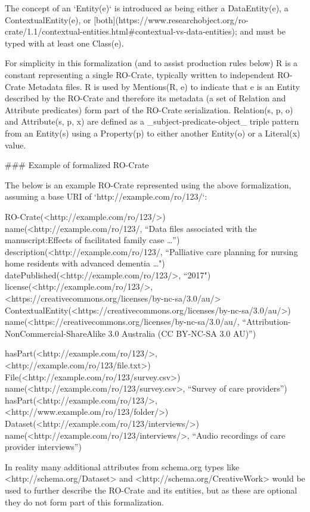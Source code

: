 The concept of an `Entity(e)` is introduced as being either a DataEntity(e), a ContextualEntity(e), or [both](https://www.researchobject.org/ro-crate/1.1/contextual-entities.html#contextual-vs-data-entities); and must be typed with at least one Class(e). 

For simplicity in this formalization (and to assist production rules below) R is a constant representing a single RO-Crate, typically written to independent RO-Crate Metadata files. R is used by Mentions(R, e) to indicate that e is an Entity described by the RO-Crate and therefore its metadata (a set of Relation and Attribute predicates) form part of the RO-Crate serialization. Relation(s, p, o) and Attribute(s, p, x) are defined as a _subject-predicate-object_ triple pattern from an Entity(s) using a Property(p) to either another Entity(o) or a Literal(x) value.


### Example of formalized RO-Crate 

The below is an example RO-Crate represented using the above formalization, assuming a base URI of `http://example.com/ro/123/`:

    RO-Crate(<http://example.com/ro/123/>)
    name(<http://example.com/ro/123/, 
        “Data files associated with the manuscript:Effects of facilitated family case …”)
    description(<http://example.com/ro/123/, 
        “Palliative care planning for nursing home residents with advanced dementia …")
    datePublished(<http://example.com/ro/123/>, “2017")
    license(<http://example.com/ro/123/>, <https://creativecommons.org/licenses/by-nc-sa/3.0/au/>
    ContextualEntity(<https://creativecommons.org/licenses/by-nc-sa/3.0/au/>)
    name(<https://creativecommons.org/licenses/by-nc-sa/3.0/au/, 
        “Attribution-NonCommercial-ShareAlike 3.0 Australia (CC BY-NC-SA 3.0 AU)”)

    hasPart(<http://example.com/ro/123/>, <http://example.com/ro/123/file.txt>)
    File(<http://example.com/ro/123/survey.csv>)
    name(<http://example.com/ro/123/survey.csv>, “Survey of care providers”)
    hasPart(<http://example.com/ro/123/>, <http://www.example.om/ro/123/folder/>)
    Dataset(<http://example.com/ro/123/interviews/>)
    name(<http://example.com/ro/123/interviews/>, “Audio recordings of care provider interviews”)

In reality many additional attributes from schema.org types like <http://schema.org/Dataset> and <http://schema.org/CreativeWork> would be used to further describe the RO-Crate and its entities, but as these are optional they do not form part of this formalization.


